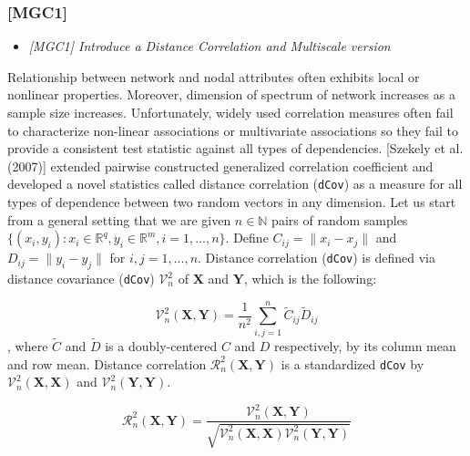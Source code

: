 \documentclass[12pt]{article}
\theoremstyle{definition}
\begin{document}
\subsubsection{[MGC1]}
\begin{itemize}
	\item {\it  [MGC1] Introduce a Distance Correlation and Multiscale version\/}
\end{itemize}

Relationship between network and nodal attributes often exhibits local or nonlinear properties. Moreover, dimension of spectrum of network increases as a sample size increases. Unfortunately, widely used correlation measures often fail to characterize non-linear associations or multivariate associations so they fail to provide a consistent test statistic against all types of dependencies. [Szekely et al. (2007)] extended pairwise constructed generalized correlation coefficient and developed a novel statistics called distance correlation (\texttt{dCov}) as a measure for all types of dependence between two random vectors in any dimension. Let us start from a general setting that we are given $n \in \mathbb{N}$ pairs of random samples $\{ (x_{i}, y_{i}) : x_{i} \in \mathbb{R}^{q}, y_{i} \in \mathbb{R}^{m}, i = 1,...,n \}$. Define $C_{ij} = \parallel x_{i} - x_{j} \parallel$ and $D_{ij} = \parallel y_{i} - y_{j} \parallel$ for $i,j=1,...,n$. 
Distance correlation (\texttt{dCov}) is defined via distance covariance (\texttt{dCov}) $\mathcal{V}^2_{n}$ of $\boldsymbol{X}$ and $\boldsymbol{Y}$, which is the following: 

\begin{equation}	 
\mathcal{V}^2_{n}(\boldsymbol{X}, \boldsymbol{Y}) = \frac{1}{n^2} \sum\limits_{i,j=1}^{n} \tilde{C}_{ij} \tilde{D}_{ij}
\end{equation}
, where $\tilde{C}$ and $\tilde{D}$ is a doubly-centered $C$ and $D$ respectively, by its column mean and row mean. Distance correlation $\mathcal{R}^{2}_{n}(\boldsymbol{X}, \boldsymbol{Y})$ is a standardized \texttt{dCov} by $\mathcal{V}^2_{n}(\boldsymbol{X}, \boldsymbol{X})$ and $\mathcal{V}^2_{n}(\boldsymbol{Y}, \boldsymbol{Y}).$

\begin{equation}	 
\mathcal{R}_{n}^{2} (\boldsymbol{X}, \boldsymbol{Y}) = \frac{\mathcal{V}^2_{n} (\boldsymbol{X}, \boldsymbol{Y}) }{\sqrt{\mathcal{V}^2_{n} (\boldsymbol{X}, \boldsymbol{X}) \mathcal{V}^2_{n} (\boldsymbol{Y}, \boldsymbol{Y}) } }
\end{equation}
	 
\end{document}
